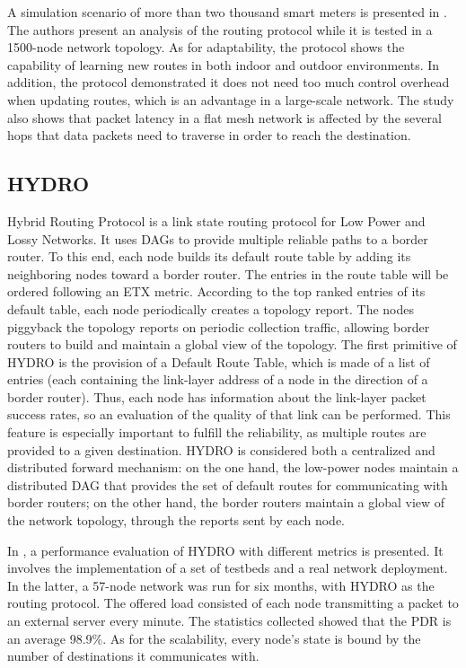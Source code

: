 \documentclass[11pt,draftclsnofoot,onecolumn]{IEEEtran}
\begin{document}
A simulation scenario of more than two thousand smart meters is presented in \cite{Iwao2010}. The authors present an analysis of the routing protocol while it is tested in a 1500-node network topology. As for adaptability, the protocol shows the capability of learning new routes in both indoor and outdoor environments. In addition, the protocol demonstrated it does not need too much control overhead when updating routes, which is an advantage in a large-scale network. The study also shows that packet latency in a flat mesh network is affected by the several hops that data packets need to traverse in order to reach the destination.

\subsection{HYDRO}\label{hydro}


Hybrid Routing Protocol \cite{Dawson2010} is a link state routing protocol for Low Power and Lossy Networks. It uses DAGs to provide multiple reliable paths to a border router. To this end, each node builds its default route table by adding its neighboring nodes toward a border router. The entries in the route table will be ordered following an ETX metric. According to the top ranked entries of its default table, each node periodically creates a topology report. The nodes piggyback the topology reports on periodic collection traffic, allowing border routers to build and maintain a global view of the topology. The first primitive of HYDRO is the provision of a Default Route Table, which is made of a list of entries (each containing the link-layer address of a node in the direction of a border router). Thus, each node has information about the link-layer packet success rates, so an evaluation of the quality of that link can be performed. This feature is especially important to fulfill the reliability, as multiple routes are provided to a given destination. HYDRO is considered both a centralized and distributed forward mechanism: on the one hand, the low-power nodes maintain a distributed DAG that provides the set of default routes for communicating with border routers; on the other hand, the border routers maintain a global view of the network topology, through the reports sent by each node. 

In \cite{Dawson2010}, a performance evaluation of HYDRO with different metrics is presented. It involves the implementation of a set of testbeds and a real network deployment. In the latter, a 57-node network was run for six months, with HYDRO as the routing protocol. The offered load consisted of each node transmitting a packet to an external server every minute. The statistics collected showed that the PDR is an average 98.9\%. As for the scalability, every node's state is bound by the number of destinations it communicates with. 
\end{document}
